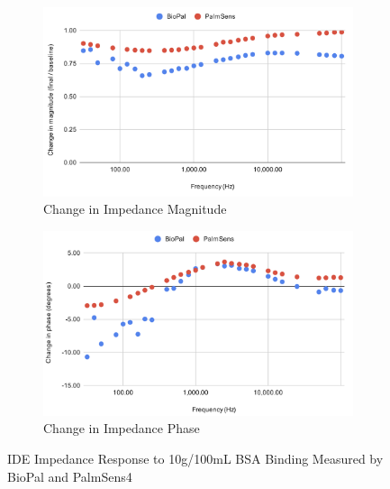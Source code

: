 \begin{figure}[H]
    \centering
    \begin{subfigure}{0.48\textwidth}
        \includegraphics[width=\textwidth]{10g:100mL mag.png}   
        \caption{Change in Impedance Magnitude}
        \label{fig:10g_mag}
    \end{subfigure}
    \hfill
    \begin{subfigure}{0.48\textwidth}
        \includegraphics[width=\textwidth]{10g:100mL phase.png}
        \caption{Change in Impedance Phase}
        \label{fig:10g_phase}
    \end{subfigure}
    \caption{IDE Impedance Response to 10g/100mL BSA Binding Measured by BioPal and PalmSens4}
    \label{fig:10g_bsa_comparison}
\end{figure}

